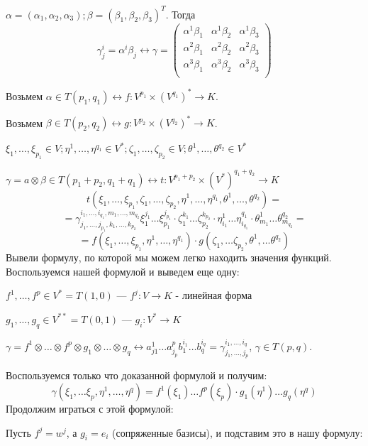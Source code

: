 $\alpha = (\alpha_1,\alpha_2,\alpha_3); \beta =(\beta_1,\beta_2,\beta_3)^T$. Тогда
$$\gamma^i_j =\alpha^i\beta_j \leftrightarrow \gamma = \begin{pmatrix}
    \alpha^1\beta_1 &\alpha^1\beta_2 & \alpha^1 \beta_3 \\
    \alpha^2\beta_1 &\alpha^2\beta_2 & \alpha^2 \beta_3 \\
     \alpha^3\beta_1 &\alpha^3\beta_2 & \alpha^3 \beta_3 \\
\end{pmatrix}$$



Возьмем $\alpha \in T(p_1,q_1) \leftrightarrow f: V^{p_1}\times(V^{q_1})^* \rightarrow K$. 

Возьмем $\beta \in T(p_2,q_2) \leftrightarrow g: V^{p_2}\times(V^{q_2})^* \rightarrow K$.

$\xi_1,\ldots, \xi_{p_1} \in V;\eta^1,\ldots, \eta^{q_1}\in V^*;\zeta_1,\ldots, \zeta_{p_2}\in V; \theta^1,\ldots, \theta^{q_2}\in V^*$

$\gamma = a \otimes \beta \in T(p_1+p_2, q_1+q_1)\leftrightarrow t: V^{p_1+p_2}\times (V^*)^{q_1+q_2}\rightarrow K$
$$t(\xi_1,\ldots,\xi_{p_1},\zeta_1,\ldots,\zeta_{p_2}, \eta^1,\ldots, \eta^{q_1},\theta^1,\ldots, \theta^{q_2}) =$$$$= \gamma_{j_1,\ldots,j_{p_1},k_1,\ldots,k_{p_2}}^{i_1,\ldots,i_{q_1},m_1,\ldots,m_{q_2}} \xi_1^{j_1}\ldots \xi_{p_1}^{j_{p_1}}\cdot \zeta_1^{k_1}\ldots \zeta_{p_2}^{k_{p_2}} \cdot \eta^1_{i_1}\ldots \eta_{i_{q_1}}^{q_1} \cdot \theta_{m_1}^1 \ldots \theta^{q_2}_{m_{q_2}} = $$
$$=f(\xi_1,\ldots, \xi_{p_1},\eta^1,\ldots, \eta^{q_1})\cdot g(\zeta_1,\ldots \zeta_{p_2}, \theta^1,\ldots \theta^{q_2}) $$
Вывели формулу, по которой мы можем легко находить значения функций. Воспользуемся нашей формулой и выведем еще одну:

$f^1,\ldots , f^p \in V^* = T(1,0)$ --- $f^j:V\rightarrow K$  - линейная форма

$g_1,\ldots,g_q\in V^{**} = T(0,1)$ --- $g_i:V^*\rightarrow K$

$\gamma = f^1\otimes \ldots \otimes f^p \otimes g_1 \otimes \ldots \otimes g_q \leftrightarrow a^1_{j1}\ldots a^{p}_{j_p}b_1^{i_1}\ldots b_q^{i_q}= \gamma^{i_1,\ldots, i_q}_{j_1,\ldots, j_p}$, $\gamma \in T(p,q)$.

Воспользуемся только что доказанной формулой и получим:
$$\gamma(\xi_1,\ldots \xi_p, \eta^1,\ldots, \eta^q)= f^1(\xi_1)\ldots f^p(\xi_p)\cdot g_1(\eta^1)\ldots g_q(\eta^q)$$
Продолжим играться с этой формулой:

Пусть $f^j = w^j$, а $g_i = e_i$ (сопряженные базисы), и подставим это в нашу формулу:

